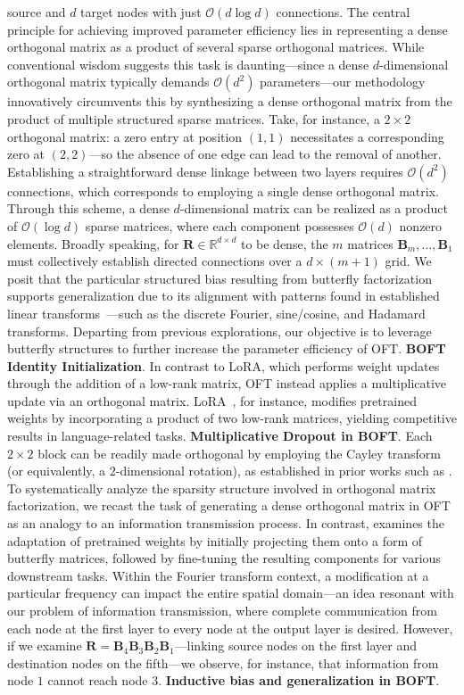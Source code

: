 source and $d$ target nodes with just $\mathcal{O}(d\log d)$ connections. The central principle for achieving improved parameter efficiency lies in representing a dense orthogonal matrix as a product of several sparse orthogonal matrices. While conventional wisdom suggests this task is daunting—since a dense $d$-dimensional orthogonal matrix typically demands $\mathcal{O}(d^2)$ parameters—our methodology innovatively circumvents this by synthesizing a dense orthogonal matrix from the product of multiple structured sparse matrices. Take, for instance, a $2\times 2$ orthogonal matrix: a zero entry at position $(1,1)$ necessitates a corresponding zero at $(2,2)$—so the absence of one edge can lead to the removal of another. Establishing a straightforward dense linkage between two layers requires $\mathcal{O}(d^2)$ connections, which corresponds to employing a single dense orthogonal matrix. Through this scheme, a dense $d$-dimensional matrix can be realized as a product of $\mathcal{O}(\log d)$ sparse matrices, where each component possesses $\mathcal{O}(d)$ nonzero elements. Broadly speaking, for $\bm{R}\in\mathbb{R}^{d\times d}$ to be dense, the $m$ matrices $\bm{B}_m,\ldots,\bm{B}_1$ must collectively establish directed connections over a $d\times (m+1)$ grid. We posit that the particular structured bias resulting from butterfly factorization supports generalization due to its alignment with patterns found in established linear transforms~\cite{dao2019kaleidoscope}—such as the discrete Fourier, sine/cosine, and Hadamard transforms. Departing from previous explorations, our objective is to leverage butterfly structures to further increase the parameter efficiency of OFT. \textbf{BOFT Identity Initialization}. In contrast to LoRA, which performs weight updates through the addition of a low-rank matrix, OFT instead applies a multiplicative update via an orthogonal matrix. LoRA~\cite{hulora2022}, for instance, modifies pretrained weights by incorporating a product of two low-rank matrices, yielding competitive results in language-related tasks. \textbf{Multiplicative Dropout in BOFT}. Each $2 \times 2$ block can be readily made orthogonal by employing the Cayley transform (or equivalently, a $2$-dimensional rotation), as established in prior works such as \cite{liu2021orthogonal,qiu2023controlling}. To systematically analyze the sparsity structure involved in orthogonal matrix factorization, we recast the task of generating a dense orthogonal matrix in OFT as an analogy to an information transmission process. In contrast, \cite{dao2022monarch} examines the adaptation of pretrained weights by initially projecting them onto a form of butterfly matrices, followed by fine-tuning the resulting components for various downstream tasks. Within the Fourier transform context, a modification at a particular frequency can impact the entire spatial domain—an idea resonant with our problem of information transmission, where complete communication from each node at the first layer to every node at the output layer is desired. However, if we examine $\bm{R}=\bm{B}_4\bm{B}_3\bm{B}_2\bm{B}_1$—linking source nodes on the first layer and destination nodes on the fifth—we observe, for instance, that information from node $1$ cannot reach node $3$. \textbf{Inductive bias and generalization in BOFT}. 